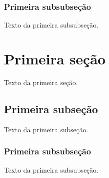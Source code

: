 \documentclass[a4paper,12pt,oneside,onecolumn,final,fleqn]{repUERJ}
\begin{document}
\subsubsection{Primeira subsubseção}

Texto da primeira subsubseção.


\section{Primeira seção}

Texto da primeira seção.

\subsection{Primeira subseção}

Texto da primeira subseção.

\subsubsection{Primeira subsubseção}

Texto da primeira subsubseção.

\end{document}
